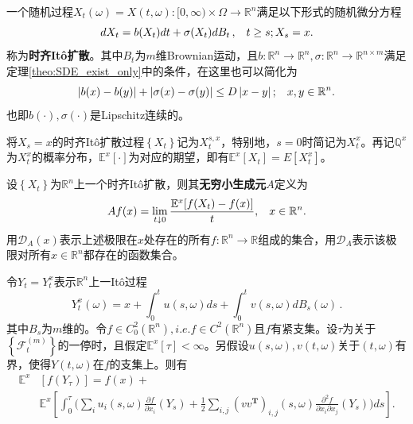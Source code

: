 \documentclass[oneside]{sysuthesis}
\begin{document}
\begin{definition}\label{def:Ito_diffusion}
	一个随机过程$X_t(\omega)=X(t,\omega):[0,\infty)\times\Omega\to\mathbb{R}^n$满足以下形式的随机微分方程
	\[
	dX_t=b(X_t)dt+\sigma(X_t)dB_t\,,\hspace{0.3cm}t\ge s;X_s=x.
	\]
	称为\textbf{时齐It\^o扩散}。其中$B_t$为$m$维Brownian运动，且$b:\mathbb{R}^n\to\mathbb{R}^n,\sigma:\mathbb{R}^n\to\mathbb{R}^{n\times m}$满足定理\ref{theo:SDE_exist_only}中的条件，在这里也可以简化为
	\[
	\left\vert b(x)-b(y)\right\vert+\left\vert \sigma(x)-\sigma(y)\right\vert\le D\left\vert x-y\right\vert;\hspace{0.3cm}x,y\in\mathbb{R}^n.
	\]
	也即$b(\cdot),\sigma(\cdot)$是Lipschitz连续的。
\end{definition}

将$X_s=x$的时齐It\^o扩散过程$\left\{X_t\right\}$记为$X_t^{s,x}$，特别地，$s=0$时简记为$X_t^x$。再记$\mathbb{Q}^x$为$X_t^x$的概率分布，$\mathbb{E}^x[\cdot]$为对应的期望，即有$\mathbb{E}^x[X_t]=E[X_t^x]$。

\begin{definition}\label{def:infinitesimal_generator}
	设$\left\{X_t\right\}$为$\mathbb{R}^n$上一个时齐It\^o扩散，则其\textbf{无穷小生成元}$A$定义为
	\[
	Af(x)=\lim_{t\downarrow 0}\frac{\mathbb{E}^x[f(X_t)-f(x)]}{t},\hspace{0.3cm}x\in\mathbb{R}^n.
	\]
	用$\mathcal{D}_A(x)$表示上述极限在$x$处存在的所有$f:\mathbb{R}^n\to\mathbb{R}$组成的集合，用$\mathcal{D}_A$表示该极限对所有$x\in\mathbb{R}^n$都存在的函数集合。
\end{definition}

\begin{theorem}\label{theo:lemma_1}
	令$Y_t=Y_t^x$表示$\mathbb{R}^n$上一It\^o过程
	\[
	Y_t^x(\omega)=x+\int_{0}^{t}u(s,\omega)ds+\int_{0}^{t}v(s,\omega)dB_s(\omega)\,.
	\]
	其中$B_s$为$m$维的。令$f\in C_0^2(\mathbb{R}^n),i.e.f\in C^2(\mathbb{R}^n)$且$f$有紧支集。设$\tau$为关于$\left\{\mathcal{F}_t^{(m)}\right\}$的一停时，且假定$\mathbb{\mathbb{E}}^x[\tau]<\infty$。另假设$u(s,\omega),v(t,\omega)$关于$(t,\omega)$有界，使得$Y(t,\omega)$在$f$的支集上。则有
	\[
	\begin{aligned}
		\mathbb{\mathbb{E}}^x&[f(Y_{\tau})]=f(x)+\\
		&\mathbb{\mathbb{E}}^x\left[\int_{0}^{\tau}\bigg(\sum_i u_i(s,\omega)\frac{\partial f}{\partial x_i}(Y_s)+\frac{1}{2}\sum_{i,j}(vv^{\mathbf{T}})_{i,j}(s,\omega)\frac{\partial^2 f}{\partial x_i\partial x_j}(Y_s)\bigg)ds\right].\\
	\end{aligned}
	\]
\end{theorem}
\end{document}
